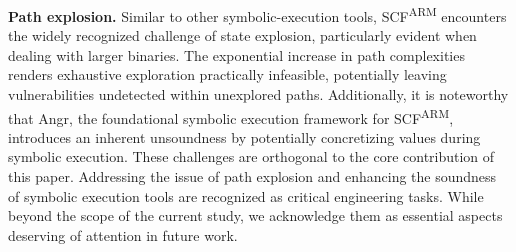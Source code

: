 \textbf{Path explosion.} Similar to other symbolic-execution tools, \ac{SCF}\textsuperscript{ARM} encounters the widely recognized challenge of state explosion, particularly evident when dealing with larger binaries. The exponential increase in path complexities renders exhaustive exploration practically infeasible, potentially leaving vulnerabilities undetected within unexplored paths. Additionally, it is noteworthy that Angr, the foundational symbolic execution framework for \ac{SCF}\textsuperscript{ARM}, introduces an inherent unsoundness by potentially concretizing values during symbolic execution. These challenges are orthogonal to the core contribution of this paper. Addressing the issue of path explosion and enhancing the soundness of symbolic execution tools are recognized as critical engineering tasks. While beyond the scope of the current study, we acknowledge them as essential aspects deserving of attention in future work.


